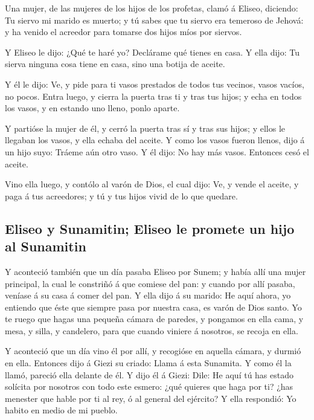  Una mujer, de las mujeres de los hijos de los profetas,
clamó á Eliseo, diciendo: Tu siervo mi marido es muerto; y tú sabes que
tu siervo era temeroso de Jehová: y ha venido el acreedor para tomarse
dos hijos míos por siervos.

 Y Eliseo le dijo: ¿Qué te haré yo? Declárame qué tienes en
casa. Y ella dijo: Tu sierva ninguna cosa tiene en casa, sino una botija
de aceite.

 Y él le dijo: Ve, y pide para ti vasos prestados de todos
tus vecinos, vasos vacíos, no pocos.  Entra luego, y cierra
la puerta tras ti y tras tus hijos; y echa en todos los vasos, y en
estando uno lleno, ponlo aparte.

 Y partióse la mujer de él, y cerró la puerta tras sí y tras
sus hijos; y ellos le llegaban los vasos, y ella echaba del aceite.
 Y como los vasos fueron llenos, dijo á un hijo suyo: Tráeme
aún otro vaso. Y él dijo: No hay más vasos. Entonces cesó el aceite.

 Vino ella luego, y contólo al varón de Dios, el cual dijo:
Ve, y vende el aceite, y paga á tus acreedores; y tú y tus hijos vivid
de lo que quedare.

\hypertarget{eliseo-y-sunamitin-eliseo-le-promete-un-hijo-al-sunamitin}{%
\subsection{Eliseo y Sunamitin; Eliseo le promete un hijo al
Sunamitin}\label{eliseo-y-sunamitin-eliseo-le-promete-un-hijo-al-sunamitin}}

 Y aconteció también que un día pasaba Eliseo por Sunem; y
había allí una mujer principal, la cual le constriñó á que comiese del
pan: y cuando por allí pasaba, veníase á su casa á comer del pan.
 Y ella dijo á su marido: He aquí ahora, yo entiendo que
éste que siempre pasa por nuestra casa, es varón de Dios santo.
 Yo te ruego que hagas una pequeña cámara de paredes, y
pongamos en ella cama, y mesa, y silla, y candelero, para que cuando
viniere á nosotros, se recoja en ella.

 Y aconteció que un día vino él por allí, y recogióse en
aquella cámara, y durmió en ella.  Entonces dijo á Giezi su
criado: Llama á esta Sunamita. Y como él la llamó, pareció ella delante
de él.  Y dijo él á Giezi: Dile: He aquí tú has estado
solícita por nosotros con todo este esmero: ¿qué quieres que haga por
ti? ¿has menester que hable por ti al rey, ó al general del ejército? Y
ella respondió: Yo habito en medio de mi pueblo.

